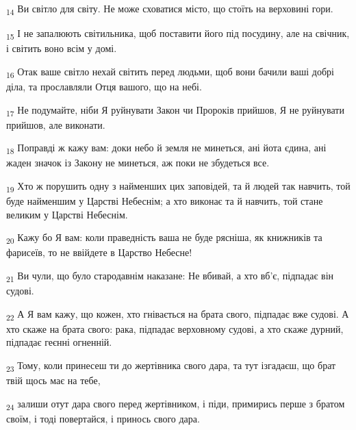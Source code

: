 \begin{tcolorbox}
\textsubscript{14} Ви світло для світу. Не може сховатися місто, що стоїть на верховині гори.
\end{tcolorbox}
\begin{tcolorbox}
\textsubscript{15} І не запалюють світильника, щоб поставити його під посудину, але на свічник, і світить воно всім у домі.
\end{tcolorbox}
\begin{tcolorbox}
\textsubscript{16} Отак ваше світло нехай світить перед людьми, щоб вони бачили ваші добрі діла, та прославляли Отця вашого, що на небі.
\end{tcolorbox}
\begin{tcolorbox}
\textsubscript{17} Не подумайте, ніби Я руйнувати Закон чи Пророків прийшов, Я не руйнувати прийшов, але виконати.
\end{tcolorbox}
\begin{tcolorbox}
\textsubscript{18} Поправді ж кажу вам: доки небо й земля не минеться, ані йота єдина, ані жаден значок із Закону не минеться, аж поки не збудеться все.
\end{tcolorbox}
\begin{tcolorbox}
\textsubscript{19} Хто ж порушить одну з найменших цих заповідей, та й людей так навчить, той буде найменшим у Царстві Небеснім; а хто виконає та й навчить, той стане великим у Царстві Небеснім.
\end{tcolorbox}
\begin{tcolorbox}
\textsubscript{20} Кажу бо Я вам: коли праведність ваша не буде рясніша, як книжників та фарисеїв, то не ввійдете в Царство Небесне!
\end{tcolorbox}
\begin{tcolorbox}
\textsubscript{21} Ви чули, що було стародавнім наказане: Не вбивай, а хто вб'є, підпадає він судові.
\end{tcolorbox}
\begin{tcolorbox}
\textsubscript{22} А Я вам кажу, що кожен, хто гнівається на брата свого, підпадає вже судові. А хто скаже на брата свого: рака, підпадає верховному судові, а хто скаже дурний, підпадає геєнні огненній.
\end{tcolorbox}
\begin{tcolorbox}
\textsubscript{23} Тому, коли принесеш ти до жертівника свого дара, та тут ізгадаєш, що брат твій щось має на тебе,
\end{tcolorbox}
\begin{tcolorbox}
\textsubscript{24} залиши отут дара свого перед жертівником, і піди, примирись перше з братом своїм, і тоді повертайся, і принось свого дара.
\end{tcolorbox}
